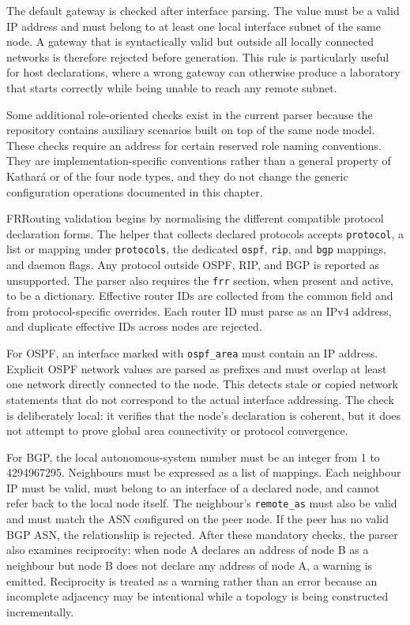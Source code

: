 The default gateway is checked after interface parsing. The value must be a
valid IP address and must belong to at least one local interface subnet of the
same node. A gateway that is syntactically valid but outside all locally
connected networks is therefore rejected before generation. This rule is
particularly useful for host declarations, where a wrong gateway can otherwise
produce a laboratory that starts correctly while being unable to reach any
remote subnet.

Some additional role-oriented checks exist in the current parser because the
repository contains auxiliary scenarios built on top of the same node model.
These checks require an address for certain reserved role naming conventions.
They are implementation-specific conventions rather than a general property of
Kathar\'a or of the four node types, and they do not change the generic
configuration operations documented in this chapter.

FRRouting validation begins by normalising the different compatible protocol
declaration forms. The helper that collects declared protocols accepts
\texttt{protocol}, a list or mapping under \texttt{protocols}, the dedicated
\texttt{ospf}, \texttt{rip}, and \texttt{bgp} mappings, and daemon flags. Any
protocol outside OSPF, RIP, and BGP is reported as unsupported. The parser also
requires the \texttt{frr} section, when present and active, to be a dictionary.
Effective router IDs are collected from the common field and from
protocol-specific overrides. Each router ID must parse as an IPv4 address, and
duplicate effective IDs across nodes are rejected.

For OSPF, an interface marked with \texttt{ospf\_area} must contain an IP
address. Explicit OSPF network values are parsed as prefixes and must overlap at
least one network directly connected to the node. This detects stale or copied
network statements that do not correspond to the actual interface addressing.
The check is deliberately local: it verifies that the node's declaration is
coherent, but it does not attempt to prove global area connectivity or protocol
convergence.

For BGP, the local autonomous-system number must be an integer from 1 to
4294967295. Neighbours must be expressed as a list of mappings. Each neighbour
IP must be valid, must belong to an interface of a declared node, and cannot
refer back to the local node itself. The neighbour's \texttt{remote\_as} must
also be valid and must match the ASN configured on the peer node. If the peer
has no valid BGP ASN, the relationship is rejected. After these mandatory
checks, the parser also examines reciprocity: when node A declares an address
of node B as a neighbour but node B does not declare any address of node A, a
warning is emitted. Reciprocity is treated as a warning rather than an error
because an incomplete adjacency may be intentional while a topology is being
constructed incrementally.

